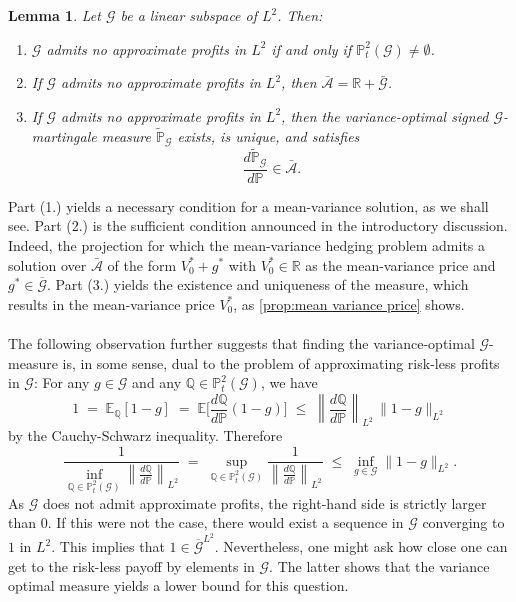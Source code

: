 \documentclass[11pt,a4paper,twoside,openany]{report}
\theoremstyle{plain} %
\newtheorem{lemma}[lemma]{Lemma}
\theoremstyle{definition} %
\theoremstyle{remark} %
\begin{document}
\begin{lemma}\label{lemma:no approximate profits}
Let $\mathcal{G}$ be a linear subspace of $L^2$. Then:
\begin{enumerate}
\item $\mathcal{G}$ admits no approximate profits in $L^2$ if and only if
$\mathbb{P}^2_t(\mathcal{G})\neq\emptyset$.

\item If $\mathcal{G}$ admits no approximate profits in $L^2$, then
$\bar{\mathcal{A}}=\mathbb{R}+\bar{\mathcal{G}}$.

\item If $\mathcal{G}$ admits no approximate profits in $L^2$, then the
variance-optimal signed $\mathcal{G}$-martingale measure $\widetilde{\mathbb{P}}_{\mathcal{G}}$
exists, is unique, and satisfies
\begin{equation}
\frac{d\widetilde{\mathbb{P}}_{\mathcal{G}}}{d\mathbb{P}}\in\bar{\mathcal{A}}.
\end{equation}
\end{enumerate}
\end{lemma}
Part (1.) yields a necessary condition for a mean-variance solution, as we shall see.
Part (2.) is the sufficient condition announced in the introductory discussion. Indeed, the projection for which the mean-variance hedging problem admits a solution over \(\bar{\mathcal{A}}\) of the form \(V_0^*+g^*\) with \(V_0^*\in\mathbb{R}\) as the mean-variance price and \(g^*\in\overline{\mathcal{G}}\). Part (3.) yields the existence and uniqueness of the measure, which results in the mean-variance price \(V_0^*\), as \cref{prop:mean variance price} shows. 
\\\\
The following observation further suggests that finding the variance-optimal \(\mathcal{G}\)-measure is, in some sense, dual to the problem of approximating risk-less profits in \(\mathcal{G}\):
\bigbreak
For any $g\in\mathcal{G}$ and any $\mathbb{Q}\in\mathbb{P}^2_t(\mathcal{G})$, we have
\[
1 \;=\; \mathbb{E}_\mathbb{Q}[1-g]
\;=\; \mathbb{E}\!\bigg[\frac{d\mathbb{Q}}{d\mathbb{P}}(1-g)\bigg]
\;\le\; \left\|\frac{d\mathbb{Q}}{d\mathbb{P}}\right\|_{L^2}\,\|1-g\|_{L^2}
\]
by the Cauchy-Schwarz inequality. Therefore
\[
\frac{1}{\inf\limits_{\mathbb{Q}\in\mathbb{P}^2_t(\mathcal{G})}\left\|\frac{d\mathbb{Q}}{d\mathbb{P}}\right\|_{L^2}}
\;=\;
\sup\limits_{\mathbb{Q}\in\mathbb{P}^2_t(\mathcal{G})}\frac{1}{\left\|\frac{d\mathbb{Q}}{d\mathbb{P}}\right\|_{L^2}}
\;\le\;
\inf\limits_{g\in\mathcal{G}}\|1-g\|_{L^2}.
\]
As \(\mathcal{G}\) does not admit approximate profits, the right-hand side is strictly larger than \(0\). If this were not the case, there would exist a sequence in \(\mathcal{G}\) converging to \(1\) in \(L^2\). This implies that \(1\in\overline{\mathcal{G}}^{L^2}\). Nevertheless, one might ask how close one can get to the risk-less payoff by elements in \(\mathcal{G}\). The latter shows that the variance optimal measure yields a lower bound for this question. 
\end{document}
